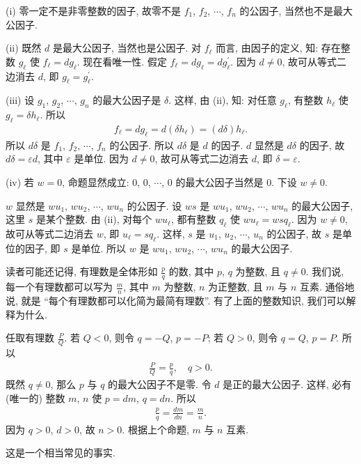 \begin{pf}
    (i) 零一定不是非零整数的因子, 故零不是 $f_1$, $f_2$, $\cdots$, $f_n$ 的公因子, 当然也不是最大公因子.

    (ii) 既然 $d$ 是最大公因子, 当然也是公因子. 对 $f_{\ell}$ 而言, 由因子的定义, 知: 存在整数 $g_{\ell}$ 使 $f_{\ell} = dg_{\ell}$. 现在看唯一性. 假定 $f_{\ell} = dg_{\ell} = dg_{\ell}^{\prime}$. 因为 $d \neq 0$, 故可从等式二边消去 $d$, 即 $g_{\ell} = g_{\ell}^{\prime}$.

    (iii) 设 $g_1$, $g_2$, $\cdots$, $g_n$ 的最大公因子是 $\delta$. 这样, 由 (ii), 知: 对任意 $g_{\ell}$, 有整数 $h_{\ell}$ 使 $g_{\ell} = \delta h_{\ell}$. 所以
    \begin{align*}
        f_{\ell} = dg_{\ell} = d(\delta h_{\ell}) = (d\delta) h_{\ell}.
    \end{align*}
    所以 $d\delta$ 是 $f_1$, $f_2$, $\cdots$, $f_n$ 的公因子. 所以 $d\delta$ 是 $d$ 的因子. $d$ 显然是 $d\delta$ 的因子, 故 $d\delta = \varepsilon d$, 其中 $\varepsilon$ 是单位. 因为 $d \neq 0$, 故可从等式二边消去 $d$, 即 $\delta = \varepsilon$.

    (iv) 若 $w = 0$, 命题显然成立: $0$, $0$, $\cdots$, $0$ 的最大公因子当然是 $0$. 下设 $w \neq 0$.

    $w$ 显然是 $wu_1$, $wu_2$, $\cdots$, $wu_n$ 的公因子. 设 $ws$ 是 $wu_1$, $wu_2$, $\cdots$, $wu_n$ 的最大公因子, 这里 $s$ 是某个整数. 由 (ii), 对每个 $wu_{\ell}$, 都有整数 $q_{\ell}$ 使 $wu_{\ell} = wsq_{\ell}$. 因为 $w \neq 0$, 故可从等式二边消去 $w$, 即 $u_{\ell} = sq_{\ell}$. 这样, $s$ 是 $u_1$, $u_2$, $\cdots$, $u_n$ 的公因子, 故 $s$ 是单位的因子, 即 $s$ 是单位. 所以 $w$ 是 $wu_1$, $wu_2$, $\cdots$, $wu_n$ 的最大公因子.
\end{pf}

\begin{example}
    读者可能还记得, 有理数是全体形如 $\frac{p}{q}$ 的数, 其中 $p$, $q$ 为整数, 且 $q \neq 0$. 我们说, 每一个有理数都可以写为 $\frac{m}{n}$, 其中 $m$ 为整数, $n$ 为正整数, 且 $m$ 与 $n$ 互素. 通俗地说, 就是 ``每个有理数都可以化简为最简有理数''. 有了上面的整数知识, 我们可以解释为什么.

    任取有理数 $\frac{P}{Q}$. 若 $Q < 0$, 则令 $q = -Q$, $p = -P$; 若 $Q > 0$, 则令 $q = Q$, $p = P$. 所以
    \begin{align*}
        \frac{P}{Q} = \frac{p}{q}, \quad q > 0.
    \end{align*}
    既然 $q \neq 0$, 那么 $p$ 与 $q$ 的最大公因子不是零. 令 $d$ 是正的最大公因子. 这样, 必有 (唯一的) 整数 $m$, $n$ 使 $p = dm$, $q = dn$. 所以
    \begin{align*}
        \frac{p}{q} = \frac{dm}{dn} = \frac{m}{n}.
    \end{align*}
    因为 $q > 0$, $d > 0$, 故 $n > 0$. 根据上个命题, $m$ 与 $n$ 互素.

    这是一个相当常见的事实.
\end{example}


